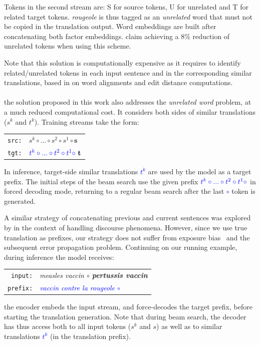 Tokens in the second stream are: S for source tokens, U for unrelated and T for related target tokens. {\it rougeole} is thus tagged as an {\it unrelated} word that must not be copied in the translation output.
Word embeddings are built after concatenating both factor embeddings.
%
\citet{xu20boosting} claim achieving a 8\% reduction of unrelated tokens when using this scheme.

Note that this solution is computationally expensive as it requires to identify related/unrelated tokens in each input sentence and in the corresponding similar translations, based in \citet{xu20boosting} on word alignments and edit distance computations.

\paragraph{} the solution proposed in this work also addresses the {\em unrelated word} problem, at a much reduced computational cost. It considers both sides of similar translations ($s^k$ and $t^k$). Training streams take the form:

\begin{center}
\begin{tabular}{rl}
\texttt{src:} & $s^{k} \circ ... \circ s^{2} \circ s^{1} \circ \textbf{s}$ \\
\texttt{tgt:} & $\textcolor{blue}{t^{k} \circ ... \circ t^{2} \circ t^{1} \circ}\ \textbf{t}$ \\
\end{tabular}
\end{center}
\noindent In inference, target-side similar translations \textcolor{blue}{$t^k$} are used by the model as a target prefix. The initial steps of the beam search use the given prefix $\textcolor{blue}{t^{k} \circ ... \circ t^{2} \circ t^{1} \circ}$ in forced decoding mode, returning to a regular beam search after the last \textcolor{blue}{$\circ$} token is generated.

A similar strategy of concatenating previous and current sentences was explored by \citet{tiedemann17neural} in the context of handling discourse phenomena.
However, since we use true translation as prefixes, our strategy does not suffer from exposure bias~\cite{Ranzato15sequence} and the subsequent error propagation problem.
%
Continuing on our running example, during inference the model receives:
\begin{center}
\begin{tabular}{rl}
\texttt{input:} & \it measles vaccin $\circ$ {\bf pertussis vaccin} \\ 
\texttt{prefix:} & \it \textcolor{blue}{vaccin contre la rougeole $\circ$} \\
\end{tabular}
\end{center}
\noindent the encoder embeds the input stream, and force-decodes the target prefix,  before starting the translation generation. Note that during beam search, the decoder has thus access both to all input tokens ($s^k$ and $s$) as well as to similar translations \textcolor{blue}{$t^k$} (in the translation prefix). 

